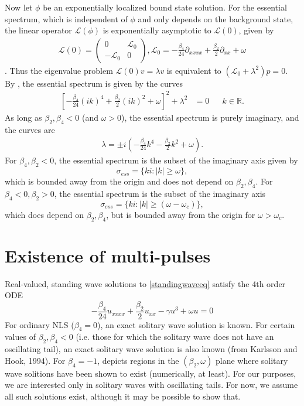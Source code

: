\documentclass[12pt]{article}
\def\R{{\mathbb R}}
\def\calL{{\mathcal L}}
\begin{document}
Now let $\phi$ be an exponentially localized bound state solution. For the essential spectrum, which is independent of $\phi$ and only depends on the background state, the linear operator $\calL(\phi)$ is exponentially asymptotic to $\calL(0)$, given by
\begin{align}\label{defL0}
\calL(0) = 
\begin{pmatrix}
0 & \calL_0 \\
-\calL_0 & 0
\end{pmatrix},
\calL_0 = -\frac{\beta_4}{24} \partial_{xxxx} + \frac{\beta_2}{2} \partial_{xx} + \omega
\end{align}.
Thus the eigenvalue problem $\calL(0) v = \lambda v$ is equivalent to $(\calL_0 + \lambda^2)p = 0$. By \cite[Theorem 3.1.13]{Kapitula2013}, the essential spectrum is given by the curves
\begin{align*}
\left[ -\frac{\beta_4}{24} (ik)^4 + \frac{\beta_2}{2}(ik)^2 + \omega \right]^2 + \lambda^2 &= 0 && k \in \R.
\end{align*}
As long as $\beta_2, \beta_4 < 0$ (and $\omega > 0$), the essential spectrum is purely imaginary, and the curves are
\begin{align*}
\lambda = \pm i \left( -\frac{\beta_4}{24}k^4 - \frac{\beta_2}{2}k^2 + \omega \right).
\end{align*}
For $\beta_4, \beta_2 < 0$, the essential spectrum is the subset of the imaginary axis given by
\begin{equation}
\sigma_{ess} = \{ k i : |k| \geq \omega \},
\end{equation}
which is bounded away from the origin and does not depend on $\beta_2,\beta_4$. For $\beta_4 < 0, \beta_2 > 0$, the essential spectrum is the subset of the imaginary axis 
\begin{equation}
\sigma_{ess} = \{ k i : |k| \geq (\omega - \omega_c) \},
\end{equation}
which does depend on $\beta_2,\beta_4$, but is bounded away from the origin for $\omega > \omega_c$.

\section{Existence of multi-pulses}

Real-valued, standing wave solutions to \cref{standingwaveeq} satisfy the 4th order ODE
\begin{equation}\label{NLS4real}
-\frac{\beta_4}{24} u_{xxxx} + \frac{\beta_2}{2} u_{xx} - \gamma u^3 + \omega u = 0
\end{equation}
For ordinary NLS ($\beta_4 = 0$), an exact solitary wave solution is known. For certain values of $\beta_2, \beta_4 < 0$ (i.e. those for which the solitary wave does not have an oscillating tail), an exact solitary wave solution is also known \cite[(5)]{Tam2020} (from Karlsson and Hook, 1994). For $\beta_4 = -1$, \cite[Figure 4(a)]{Tam2020} depicts regions in the $(\beta_2, \omega)$ plane where solitary wave solitions have been shown to exist (numerically, at least). For our purposes, we are interested only in solitary waves with oscillating tails. For now, we assume all such solutions exist, although it may be possible to show that.
\end{document}
